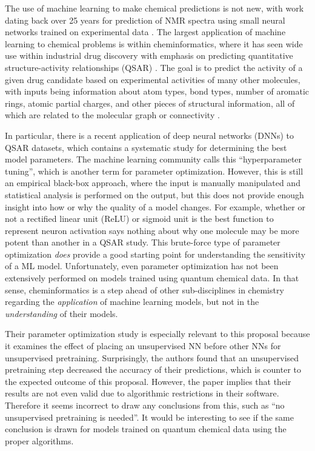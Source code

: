\documentclass[12pt]{article}
\begin{document}
The use of machine learning to make chemical predictions is not new, with work dating back over 25 years for prediction of NMR spectra using small neural networks trained on experimental data \cite{THOMSEN1989212}. The largest application of machine learning to chemical problems is within cheminformatics, where it has seen wide use within industrial drug discovery with emphasis on predicting quantitative structure-activity relationships (QSAR) \cite{doi:10.1080/17460441.2016.1201262}. The goal is to predict the activity of a given drug candidate based on experimental activities of many other molecules, with inputs being information about atom types, bond types, number of aromatic rings, atomic partial charges, and other pieces of structural information, all of which are related to the molecular graph or connectivity \cite{Kearnes2016}.

In particular, there is a recent application of deep neural networks (DNNs) to QSAR datasets\cite{doi:10.1021/ci500747n}, which contains a systematic study for determining the best model parameters. The machine learning community calls this ``hyperparameter tuning'', which is another term for parameter optimization. However, this is still an empirical black-box approach, where the input is manually manipulated and statistical analysis is performed on the output, but this does not provide enough insight into how or why the quality of a model changes. For example, whether or not a rectified linear unit (ReLU) or sigmoid unit is the best function to represent neuron activation says nothing about why one molecule may be more potent than another in a QSAR study. This brute-force type of parameter optimization \emph{does} provide a good starting point for understanding the sensitivity of a ML model. Unfortunately, even parameter optimization has not been extensively performed on models trained using quantum chemical data. In that sense, cheminformatics is a step ahead of other sub-disciplines in chemistry regarding the \emph{application} of machine learning models, but not in the \emph{understanding} of their models. 

Their parameter optimization study is especially relevant to this proposal because it examines the effect of placing an unsupervised NN before other NNs for unsupervised pretraining. Surprisingly, the authors found that an unsupervised pretraining step decreased the accuracy of their predictions, which is counter to the expected outcome of this proposal. However, the paper implies that their results are not even valid due to algorithmic restrictions in their software. Therefore it seems incorrect to draw any conclusions from this, such as ``no unsupervised pretraining is needed''. It would be interesting to see if the same conclusion is drawn for models trained on quantum chemical data using the proper algorithms.
\end{document}
